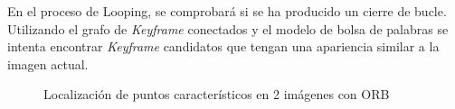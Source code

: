En el proceso de Looping, se comprobará si se ha producido un cierre de bucle. Utilizando el grafo de \textit{Keyframe} conectados y el modelo de bolsa de palabras se intenta encontrar \textit{Keyframe} candidatos que tengan una apariencia similar a la imagen actual.

\begin{figure}[H]
\begin{center}
\hspace{0.5cm}
\end{center}
\caption{Localización de puntos característicos en 2 imágenes con ORB }
\end{figure}

\clearpage

